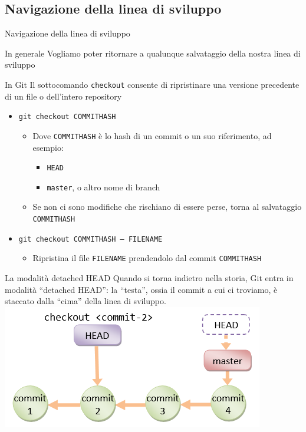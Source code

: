 \documentclass[presentation]{beamer}
\begin{document}
\subsection{Navigazione della linea di sviluppo}

\begin{frame}{Navigazione della linea di sviluppo}
	\begin{block}{In generale}
		Vogliamo poter ritornare a qualunque salvataggio della nostra linea di sviluppo
	\end{block}
	\begin{block}{In Git}
		Il sottocomando \texttt{checkout} consente di ripristinare una versione precedente di un file o dell'intero repository
		\begin{itemize}
			\item \texttt{git checkout COMMITHASH}
			\begin{itemize}
				\item Dove \texttt{COMMITHASH} è lo hash di un commit o un suo riferimento, ad esempio:
				\begin{itemize}
					\item \texttt{HEAD}
					\item \texttt{master}, o altro nome di branch
				\end{itemize}
				\item Se non ci sono modifiche che rischiano di essere perse, torna al salvataggio \texttt{COMMITHASH}
			\end{itemize}
			\item \texttt{git checkout COMMITHASH -- FILENAME}
			\begin{itemize}
				\item Ripristina il file \texttt{FILENAME} prendendolo dal commit \texttt{COMMITHASH}
			\end{itemize}
		\end{itemize}
	\end{block}
	\begin{block}{La modalità detached HEAD}
		Quando si torna indietro nella storia, Git entra in modalità ``detached HEAD'': la ``testa'', ossia il commit a cui ci troviamo, è staccato dalla ``cima'' della linea di sviluppo.\\
		\centering
		\includegraphics[width=.4\textwidth]{img/detached}

\end{block}
\end{frame}
\end{document}
